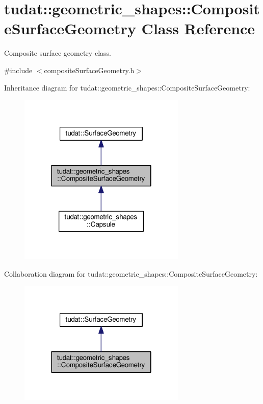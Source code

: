 \hypertarget{classtudat_1_1geometric__shapes_1_1CompositeSurfaceGeometry}{}\section{tudat\+:\+:geometric\+\_\+shapes\+:\+:Composite\+Surface\+Geometry Class Reference}
\label{classtudat_1_1geometric__shapes_1_1CompositeSurfaceGeometry}


Composite surface geometry class.  




{\ttfamily \#include $<$composite\+Surface\+Geometry.\+h$>$}



Inheritance diagram for tudat\+:\+:geometric\+\_\+shapes\+:\+:Composite\+Surface\+Geometry\+:
\nopagebreak
\begin{figure}[H]
\begin{center}
\leavevmode
\includegraphics[width=226pt]{classtudat_1_1geometric__shapes_1_1CompositeSurfaceGeometry__inherit__graph}
\end{center}
\end{figure}


Collaboration diagram for tudat\+:\+:geometric\+\_\+shapes\+:\+:Composite\+Surface\+Geometry\+:
\nopagebreak
\begin{figure}[H]
\begin{center}
\leavevmode
\includegraphics[width=226pt]{classtudat_1_1geometric__shapes_1_1CompositeSurfaceGeometry__coll__graph}
\end{center}
\end{figure}
